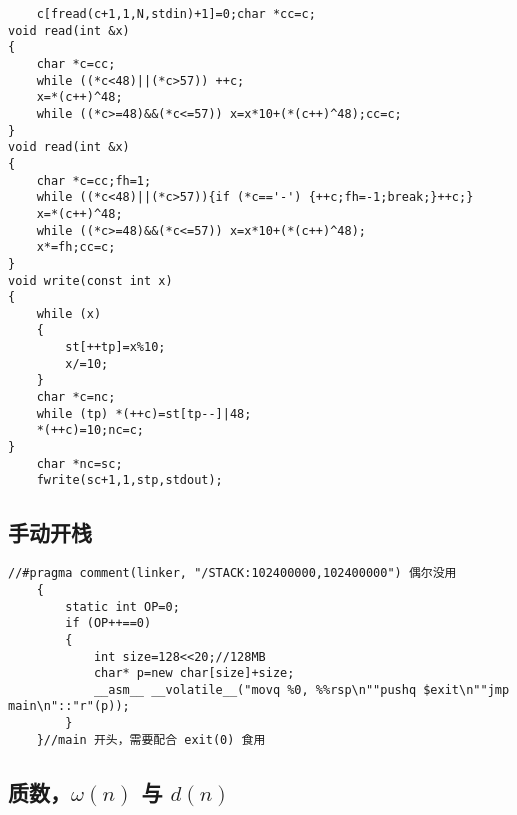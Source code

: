 \documentclass{ctexart}
\begin{document}
\begin{lstlisting}
	c[fread(c+1,1,N,stdin)+1]=0;char *cc=c;
void read(int &x)
{
	char *c=cc;
	while ((*c<48)||(*c>57)) ++c;
	x=*(c++)^48;
	while ((*c>=48)&&(*c<=57)) x=x*10+(*(c++)^48);cc=c;
}
void read(int &x)
{
	char *c=cc;fh=1;
	while ((*c<48)||(*c>57)){if (*c=='-') {++c;fh=-1;break;}++c;}
	x=*(c++)^48;
	while ((*c>=48)&&(*c<=57)) x=x*10+(*(c++)^48);
	x*=fh;cc=c;
}
void write(const int x)
{
	while (x)
	{
		st[++tp]=x%10;
		x/=10;
	}
	char *c=nc;
	while (tp) *(++c)=st[tp--]|48;
	*(++c)=10;nc=c;
}
	char *nc=sc;
	fwrite(sc+1,1,stp,stdout);
\end{lstlisting}

\subsection{手动开栈}

\begin{lstlisting}
//#pragma comment(linker, "/STACK:102400000,102400000") 偶尔没用
	{
		static int OP=0;
		if (OP++==0)
		{
			int size=128<<20;//128MB
			char* p=new char[size]+size;
			__asm__ __volatile__("movq %0, %%rsp\n""pushq $exit\n""jmp main\n"::"r"(p));
		}
	}//main 开头，需要配合 exit(0) 食用
\end{lstlisting}



\subsection{质数，$\omega(n)$ 与 $d(n)$}
\end{document}
